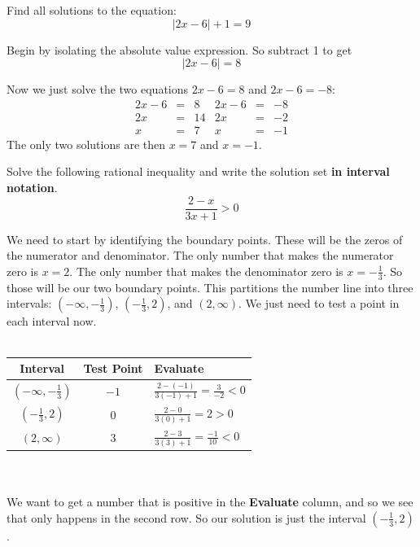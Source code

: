 \documentclass {article}
\newenvironment{prob}[2][]{\begin{trivlist}
\item[\hskip \labelsep {\bfseries #1}\hskip \labelsep {\bfseries #2.}]}{\end{trivlist}}
\begin{document}
\vspace {1cm}

\begin {prob}{3}
    Find all solutions to the equation:
    \[ \left| 2x - 6 \right| + 1 = 9 \]
\end {prob}

Begin by isolating the absolute value expression. So subtract 1 to get
\[ |2x - 6| = 8 \]

Now we just solve the two equations $2x-6=8$ and $2x-6 = -8$:
\[ 
    \begin{array}{ccc|ccc}
        2x - 6 &=& 8  &  2x - 6 &=& -8 \\
        2x     &=& 14 &  2x     &=& -2 \\
        x      &=& 7  &  x      &=& -1
    \end{array}
\]
The only two solutions are then $x=7$ and $x=-1$.

\newpage

\begin {prob}{4}
    Solve the following rational inequality and write the solution set \textbf{in interval notation}.
    \[ \frac{2 - x}{3x + 1} > 0 \]
\end {prob}

We need to start by identifying the boundary points. These will be the zeros of the numerator and denominator.
The only number that makes the numerator zero is $x=2$. The only number that makes the denominator zero is $x = -\frac{1}{3}$.
So those will be our two boundary points. This partitions the number line into three intervals: $\left(-\infty,-\frac{1}{3}\right)$,
$\left(-\frac{1}{3},2\right)$, and $(2,\infty)$. We just need to test a point in each interval now. \\ \\
\begin {tabular}{|c|c|l|} \hline
    \textbf{Interval} & \textbf{Test Point} & \textbf{Evaluate} \\ [2ex] \hline
    $\left(-\infty,-\frac{1}{3}\right)$ & $-1$ & $\frac{2-(-1)}{3(-1)+1} = \frac{3}{-2} < 0$ \\ [2ex] \hline
    $\left(-\frac{1}{3},2\right)$ & 0 & $\frac{2-0}{3(0)+1} = 2 > 0$ \\ [2ex] \hline
    $(2,\infty)$ & 3 & $\frac{2-3}{3(3)+1} = \frac{-1}{10} < 0$ \\ \hline
\end {tabular} \\ \\
We want to get a number that is positive in the \textbf{Evaluate} column, and so we see that only happens in the second row.
So our solution is just the interval $\left( -\frac{1}{3}, 2\right)$.
\end{document}
